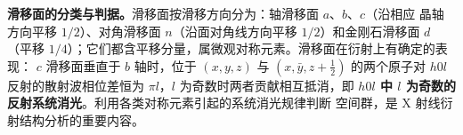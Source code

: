 \textbf{滑移面的分类与判据。}滑移面按滑移方向分为：轴滑移面 $a$、$b$、$c$（沿相应
晶轴方向平移 $1/2$）、对角滑移面 $n$（沿面对角线方向平移 $1/2$）和金刚石滑移面 $d$
（平移 $1/4$）；它们都含平移分量，属微观对称元素。滑移面在衍射上有确定的表现：
$c$ 滑移面垂直于 $b$ 轴时，位于 $(x,y,z)$ 与 $(x,\bar y,z+\tfrac12)$ 的两个原子对
$h0l$ 反射的散射波相位差恒为 $\pi l$，$l$ 为奇数时两者贡献相互抵消，即
\textbf{$h0l$ 中 $l$ 为奇数的反射系统消光}。利用各类对称元素引起的系统消光规律判断
空间群，是 X 射线衍射结构分析的重要内容。
